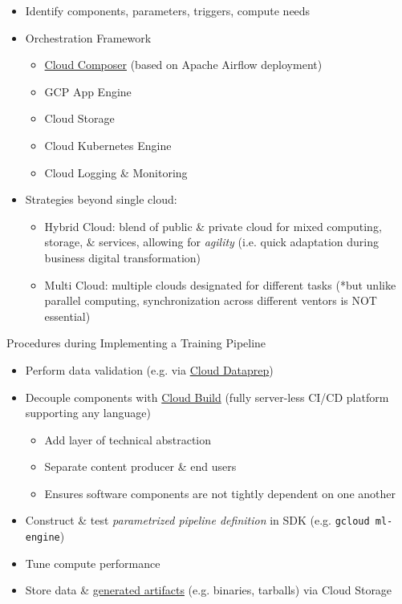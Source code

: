\documentclass[10pt,landscape,letterpaper]{cheatsheet}
\begin{document}
\begin{multicols}{3}
\begin{itemize}
    \item Identify components, parameters, triggers, compute needs
    \item Orchestration Framework
    \begin{itemize}
        \item \href{https://cloud.google.com/composer/docs/concepts/overview}{Cloud Composer} (based on Apache Airflow deployment)
        \item GCP App Engine
        \item Cloud Storage
        \item Cloud Kubernetes Engine
        \item Cloud Logging \& Monitoring
    \end{itemize}
    \item Strategies beyond single cloud:
    \begin{itemize}
        \item Hybrid Cloud: blend of public \& private cloud for mixed computing, storage, \& services, allowing for \textit{agility} (i.e. quick adaptation during business digital transformation)
        \item Multi Cloud: multiple clouds designated for different tasks (*but unlike parallel computing, synchronization across different ventors is NOT essential)
    \end{itemize}
\end{itemize}

Procedures during Implementing a Training Pipeline

\begin{itemize}
    \item Perform data validation (e.g. via \href{https://cloud.google.com/dataprep/docs/html/Validate-Your-Data_57344604}{Cloud Dataprep})
    \item Decouple components with \href{https://cloud.google.com/cloud-build}{Cloud Build} (fully server-less CI/CD platform supporting any language)
    \begin{itemize}
        \item Add layer of technical abstraction
        \item Separate content producer \& end users
        \item Ensures software components are not tightly dependent on one another
    \end{itemize}
    \item Construct \& test \textit{parametrized pipeline definition} in SDK (e.g. \texttt{gcloud ml-engine})
    \item Tune compute performance
    \item Store data \& \href{https://cloud.google.com/cloud-build/docs/building/store-build-artifacts}{generated artifacts} (e.g. binaries, tarballs) via Cloud Storage
\end{itemize}


\end{multicols}
\end{document}

